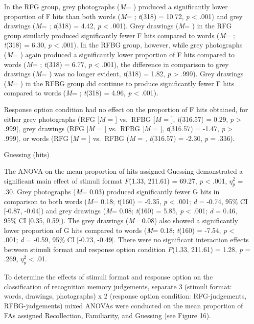 \documentclass[
  11pt,
]{article}
\begin{document}
In the RFG group, grey photographs (\emph{M}= ) produced a significantly
lower proportion of F hits than both words (\emph{M}= ; \emph{t}(318) =
10.72, \emph{p} \textless{} .001) and grey drawings (\emph{M}= ;
\emph{t}(318) = 4.42, \emph{p} \textless{} .001). Grey drawings
(\emph{M}= ) in the RFG group similarly produced significantly fewer F
hits compared to words (\emph{M}= ; \emph{t}(318) = 6.30, \emph{p}
\textless{} .001). In the RFBG group, however, while grey photographs
(\emph{M}= ) again produced a significantly lower proportion of F hits
compared to words (\emph{M}= ; \emph{t}(318) = 6.77, \emph{p}
\textless{} .001), the difference in comparison to grey drawings
(\emph{M}= ) was no longer evident, \emph{t}(318) = 1.82, \emph{p}
\textgreater{} .999). Grey drawings (\emph{M}= ) in the RFBG group did
continue to produce significantly fewer F hits compared to words
(\emph{M}= ; \emph{t}(318) = 4.96, \emph{p} \textless{} .001).

Response option condition had no effect on the proportion of F hits
obtained, for either grey photographs (RFG {[}\emph{M} = {]} vs.~RFBG
{[}\emph{M} = {]}, \emph{t}(316.57) = 0.29, \emph{p} \textgreater{}
.999), grey drawings (RFG {[}\emph{M} = {]} vs.~RFBG {[}\emph{M} = {]},
\emph{t}(316.57) = -1.47, \emph{p} \textgreater{} .999), or words (RFG
{[}\emph{M} = {]} vs.~RFBG (\emph{M} = , \emph{t}(316.57) = -2.30,
\emph{p} = .336).

Guessing (hits)

The ANOVA on the mean proportion of hits assigned Guessing demonstrated
a significant main effect of stimuli format \emph{F}(1.33, 211.61) =
69.27, \emph{p} \textless{} .001, \(\eta^2_p\) = .30. Grey photographs
(\emph{M}= 0.03) produced significantly fewer G hits in comparison to
both words (\emph{M}= 0.18; \emph{t}(160) = -9.35, \emph{p} \textless{}
.001; \emph{d} = -0.74, 95\% CI {[}-0.87, -0.64{]}) and grey drawings
(\emph{M}= 0.08; \emph{t}(160) = 5.85, \emph{p} \textless{} .001;
\emph{d} = 0.46, 95\% CI {[}0.35, 0.59{]}). The grey drawings (\emph{M}=
0.08) also showed a significantly lower proportion of G hits compared to
words (\emph{M}= 0.18; \emph{t}(160) = -7.54, \emph{p} \textless{} .001;
\emph{d} = -0.59, 95\% CI {[}-0.73, -0.49{]}. There were no significant
interaction effects between stimuli format and response option condition
\emph{F}(1.33, 211.61) = 1.28, \emph{p} = .269, \(\eta^2_p\) \textless{}
.01.

To determine the effects of stimuli format and response option on the
classification of recognition memory judgements, separate 3 (stimuli
format: words, drawings, photographs) x 2 (response option condition:
RFG-judgements, RFBG-judgements) mixed ANOVAs were conducted on the mean
proportion of FAs assigned Recollection, Familiarity, and Guessing (see
Figure 16).
\end{document}

